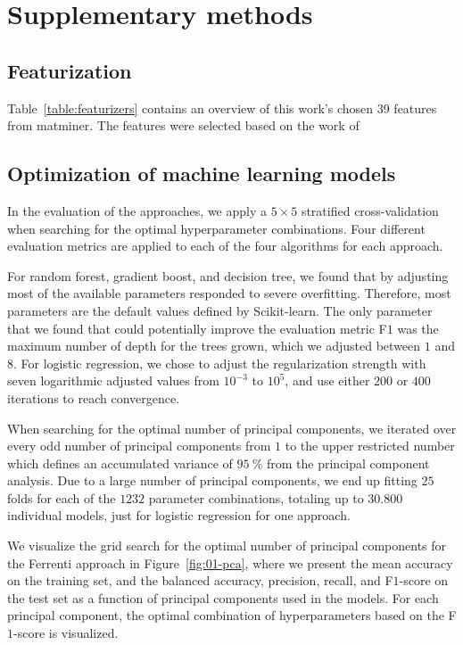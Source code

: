 \documentclass[superscriptaddress,unsortedaddress,
 amsmath,amssymb,
 aps,
]{revtex4-2}
\begin{document}
\section*{Supplementary methods}
\subsection*{Featurization}
Table~\ref{table:featurizers} contains an overview of this work's chosen 39 features from matminer. The features were selected based on
the work of 




\subsection*{Optimization of machine learning models}

In the evaluation of the approaches, we apply a $5\times 5$ stratified cross-validation when searching for the optimal hyperparameter combinations. Four different evaluation metrics are applied to each of the four algorithms for each approach. 

For random forest, gradient boost, and decision tree, we found that by adjusting most of the available parameters responded to severe overfitting. Therefore, most parameters are the default values defined by Scikit-learn. The only parameter that we found that could potentially improve the evaluation metric F$1$ was the maximum number of depth for the trees grown, which we adjusted between $1$ and $8$. For logistic regression, we chose to adjust the regularization strength with seven logarithmic adjusted values from $10^{-3}$ to $10^{5}$, and use either $200$ or $400$ iterations to reach convergence. 

When searching for the optimal number of principal components, we iterated over every odd number of principal components from $1$ to the upper restricted number which defines an accumulated variance of $95 \ \%$ from the principal component analysis. Due to a large number of principal components, we end up fitting $25$ folds for each of the $1232$ parameter combinations, totaling up to $30.800$ individual models, just for logistic regression for one approach.

We visualize the grid search for the optimal number of principal components for the Ferrenti approach in Figure~\ref{fig:01-pca}, where we present the mean accuracy on the training set, and the balanced accuracy, precision, recall, and F$1$-score on the test set as a function of principal components used in the models. For each principal component, the optimal combination of hyperparameters based on the F$1$-score is visualized. 
\end{document}
